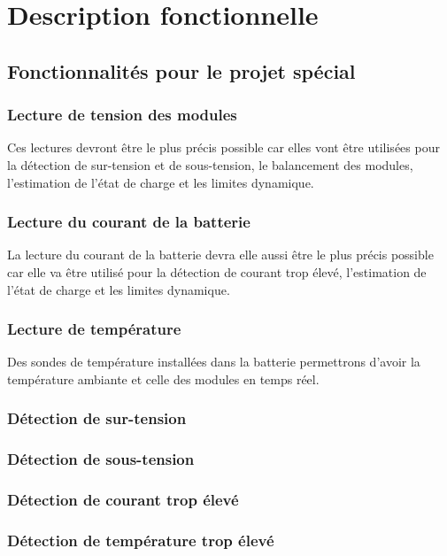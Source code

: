 
\section{Description fonctionnelle}

	\subsection{Fonctionnalités pour le projet spécial}
		\subsubsection{Lecture de tension des modules}
		Ces lectures devront être le plus précis possible car elles vont être utilisées pour la détection de sur-tension et de sous-tension, le balancement des modules, l'estimation de l'état de charge et les limites dynamique. 
		
		\subsubsection{Lecture du courant de la batterie}
		La lecture du courant de la batterie devra elle aussi être le plus précis possible car elle va être utilisé pour la détection de courant trop élevé, l'estimation de l'état de charge et les limites dynamique.
		
		\subsubsection{Lecture de température}
		Des sondes de température installées dans la batterie permettrons d'avoir la température ambiante et celle des modules en temps réel. 
		
		\subsubsection{Détection de sur-tension}
		
		\subsubsection{Détection de sous-tension}
		
		\subsubsection{Détection de courant trop élevé}
		
		\subsubsection{Détection de température trop élevé}
		
